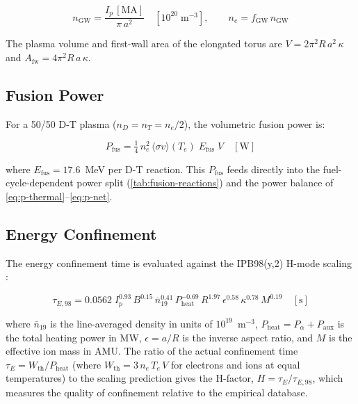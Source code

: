 \documentclass{article}
\begin{document}
\begin{equation}
\label{eq:greenwald}
n_{\text{GW}} = \frac{I_p\,[\text{MA}]}{\pi\,a^2}
  \quad [10^{20}\;\text{m}^{-3}],
\qquad
n_e = f_{\text{GW}}\,n_{\text{GW}}
\end{equation}

The plasma volume and first-wall area of the elongated torus are
$V = 2\pi^2 R\,a^2\,\kappa$ and $A_{\text{fw}} = 4\pi^2 R\,a\,\kappa$.

\subsection{Fusion Power}

For a 50/50 D-T plasma ($n_D = n_T = n_e/2$), the volumetric fusion
power is:

\begin{equation}
\label{eq:pfus-tokamak}
P_{\text{fus}} = \tfrac{1}{4}\,n_e^2\,
  \langle\sigma v\rangle(T_e)\;E_{\text{fus}}\;V
  \quad [\text{W}]
\end{equation}

\noindent where $E_{\text{fus}} = 17.6$~MeV per D-T reaction.
This $P_{\text{fus}}$ feeds directly into the fuel-cycle-dependent
power split (\cref{tab:fusion-reactions}) and the power balance
of \cref{eq:p-thermal}--\cref{eq:p-net}.

\subsection{Energy Confinement}

The energy confinement time is evaluated against the IPB98(y,2)
H-mode scaling \citep{iterphysics1999}:

\begin{equation}
\label{eq:ipb98y2}
\tau_{E,98} = 0.0562\;
  I_p^{0.93}\,B^{0.15}\,\bar{n}_{19}^{0.41}\,
  P_{\text{heat}}^{-0.69}\,R^{1.97}\,\epsilon^{0.58}\,
  \kappa^{0.78}\,M^{0.19}
  \quad [\text{s}]
\end{equation}

\noindent where $\bar{n}_{19}$ is the line-averaged density in units of
$10^{19}$~m$^{-3}$, $P_{\text{heat}} = P_\alpha + P_{\text{aux}}$ is
the total heating power in MW, $\epsilon = a/R$ is the inverse aspect
ratio, and $M$ is the effective ion mass in AMU. The ratio of the
actual confinement time $\tau_E = W_{\text{th}} / P_{\text{heat}}$
(where $W_{\text{th}} = 3\,n_e\,T_e\,V$ for electrons and ions at
equal temperatures) to the scaling prediction gives the H-factor,
$H = \tau_E / \tau_{E,98}$, which measures the quality of confinement
relative to the empirical database.
\end{document}

